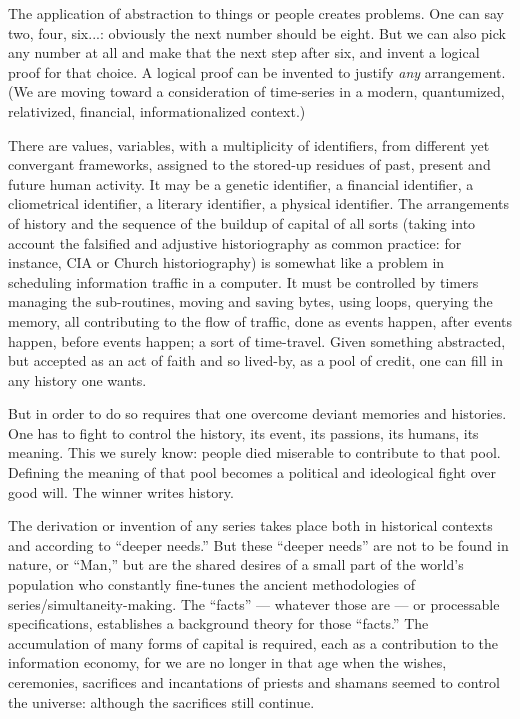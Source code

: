 \documentclass[11pt,twoside,draft]{memoir}
\begin{document}
The application of abstraction to things or
people creates problems. One can say two,
four, six...: obviously the next number
should be eight. But we can also pick any
number at all and make that the next step
after six, and invent a logical proof for that
choice. A logical proof can be invented to
justify \emph{any} arrangement. (We are moving
toward a consideration of time-series in a
modern, quantumized, relativized, financial,
informationalized context.)

There are values, variables, with a multiplicity of identifiers, from different yet convergant frameworks, assigned to the stored-up residues of past, present and future human activity. It may be a genetic identifier, a
financial identifier, a cliometrical identifier,
a literary identifier, a physical identifier.
The arrangements of history and the sequence
of the buildup of capital of all sorts (taking
into account the falsified and adjustive historiography as common practice: for instance,
CIA or Church historiography) is somewhat
like a problem in scheduling information
traffic in a computer. It must be controlled by
timers managing the sub-routines, moving
and saving bytes, using loops, querying the
memory, all contributing to the flow of traffic,
done as events happen, after events happen,
before events happen; a sort of time-travel.
Given something abstracted, but accepted as
an act of faith and so lived-by, as a pool of
credit, one can fill in any history one wants.

But in order to do so requires that one
overcome deviant memories and histories.
One has to fight to control the history, its
event, its passions, its humans, its meaning.
This we surely know: people died miserable
to contribute to that pool. Defining the
meaning of that pool becomes a political and
ideological fight over good will. The winner
writes history.

The derivation or invention of any series
takes place both in historical contexts and
according to \enquote{deeper needs.} But these
\enquote{deeper needs} are not to be found in nature,
or \enquote{Man,} but are the shared desires of a
small part of the world's population who
constantly fine-tunes the ancient methodologies of series\slash simultaneity-making. The
\enquote{facts} --- whatever those are --- or processable
specifications, establishes a background
theory for those \enquote{facts.} The accumulation
of many forms of capital is required, each as
a contribution to the information economy,
for we are no longer in that age when the
wishes, ceremonies, sacrifices and incantations of priests and shamans seemed to control the universe: although the sacrifices still continue.
\end{document}
